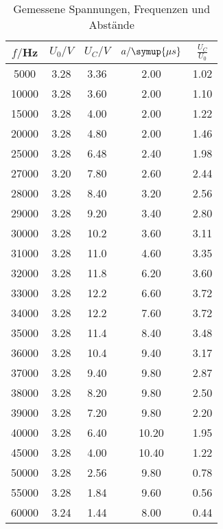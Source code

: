 \begin{table}[H]
  \centering
  \caption{Gemessene Spannungen, Frequenzen und Abstände}
  \label{tab:Spannungsamplitude}
  \begin{tabular}{c c c c c}
    \toprule
    $f/$Hz & $U_0/V$ & $U_C/V$ & $a/\symup{\mu s}$ & $\frac{U_C}{U_0}$   \\
    \midrule
    5000 & 3.28  &  3.36  &  2.00  &  1.02 \\
   10000 & 3.28  &  3.60  &  2.00  &  1.10 \\
   15000 & 3.28  &  4.00  &  2.00  &  1.22 \\
   20000 & 3.28  &  4.80  &  2.00  &  1.46 \\
   25000 & 3.28  &  6.48  &  2.40  &  1.98 \\
   27000 & 3.20  &  7.80  &  2.60  &  2.44 \\
   28000 & 3.28  &  8.40  &  3.20  &  2.56 \\
   29000 & 3.28  &  9.20  &  3.40  &  2.80 \\
   30000 & 3.28  &  10.2  &  3.60  &  3.11 \\
   31000 & 3.28  &  11.0  &  4.60  &  3.35 \\
   32000 & 3.28  &  11.8  &  6.20  &  3.60 \\
   33000 & 3.28  &  12.2  &  6.60  &  3.72 \\
   34000 & 3.28  &  12.2  &  7.60  &  3.72 \\
   35000 & 3.28  &  11.4  &  8.40  &  3.48 \\
   36000 & 3.28  &  10.4  &  9.40  &  3.17 \\
   37000 & 3.28  &  9.40  &  9.80  &  2.87 \\
   38000 & 3.28  &  8.20  &  9.80  &  2.50 \\
   39000 & 3.28  &  7.20  &  9.80  &  2.20 \\
   40000 & 3.28  &  6.40  &  10.20 &  1.95 \\
   45000 & 3.28  &  4.00  &  10.40 &  1.22 \\
   50000 & 3.28  &  2.56  &  9.80  &  0.78 \\
   55000 & 3.28  &  1.84  &  9.60  &  0.56 \\
   60000 & 3.24  &  1.44  &  8.00  &  0.44 \\
    \bottomrule
  \end{tabular}
\end{table}
